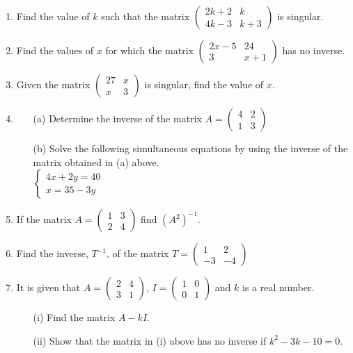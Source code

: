 \begin{enumerate}
	\item Find the value of $k$ such that the matrix $
	\begin{pmatrix}
	2k + 2 & k \\
	4k - 3 & k + 3
	\end{pmatrix}$ is singular.
	
	\item Find the values of $x$ for which the matrix $
	\begin{pmatrix}
	2x - 5 & 24 \\
	3 & x + 1
	\end{pmatrix}$ has no inverse.
	
	\item Given the matrix $ 
	\begin{pmatrix}
	27 & x \\
	x & 3
	\end{pmatrix}$ is singular, find the value of $x$.
	
	\item 
		\begin{itemize}
		\item[(a)] Determine the inverse of the matrix $A = 
	\begin{pmatrix}
	4 & 2 \\
	1 & 3
	\end{pmatrix}$ 
		\item[(b)] Solve the following simultaneous equations by using the inverse of the matrix obtained in (a) above. \\
	$\left\{
	\begin{array}{l}
	4x + 2y = 40\\
	x = 35 - 3y
	\end{array} \right.$
		\end{itemize}
	
	\item If the matrix $A = 
	\begin{pmatrix}
	1 & 3 \\
	2 & 4
	\end{pmatrix}$ find $(A^2)^{-1}$.
	
	\item Find the inverse, $T^{-1}$, of the matrix $T = 
	\begin{pmatrix}
	1 & 2 \\
	-3 & -4
	\end{pmatrix}$
	
	\item It is given that $A = 
	\begin{pmatrix}
	2 & 4 \\
	3 & 1
	\end{pmatrix}$, $I = 
	\begin{pmatrix}
	1 & 0 \\
	0 & 1
	\end{pmatrix}$ and $k$ is a real number.
		\begin{itemize}
		\item[(i)] Find the matrix $A - kI$.
		\item[(ii)] Show that the matrix in (i) above has no inverse if $k^2 - 3k - 10 = 0$.
		\end{itemize}
		

\end{enumerate}
